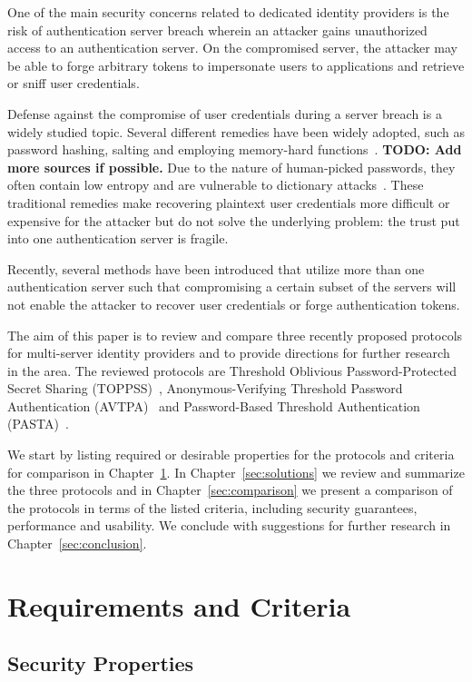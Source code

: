 \documentclass[article]{aaltoseries}
\newcommand{\todo}[1]{}
\renewcommand{\todo}[1]{{\color{red} \textbf{TODO: {#1}}}}
\begin{document}
One of the main security concerns related to dedicated identity providers is the risk of authentication server breach wherein an attacker gains unauthorized access to an authentication server. On the compromised server, the attacker may be able to forge arbitrary tokens to impersonate users to applications and retrieve or sniff user credentials. 

Defense against the compromise of user credentials during a server breach is a widely studied topic. Several different remedies have been widely adopted, such as password hashing, salting and employing memory-hard functions~\cite{argon2}. \todo{Add more sources if possible.} Due to the nature of human-picked passwords, they often contain low entropy and are vulnerable to dictionary attacks~\cite{wangdictattack}. These traditional remedies make recovering plaintext user credentials more difficult or expensive for the attacker but do not solve the underlying problem: the trust put into one authentication server is fragile.

Recently, several methods have been introduced that utilize more than one authentication server such that compromising a certain subset of the servers will not enable the attacker to recover user credentials or forge authentication tokens.

The aim of this paper is to review and compare three recently proposed protocols for multi-server identity providers and to provide directions for further research in the area. The reviewed protocols are Threshold Oblivious Password-Protected Secret Sharing (TOPPSS)~\cite{toppss}, Anonymous-Verifying Threshold Password Authentication (AVTPA)~\cite{avtpa} and Password-Based Threshold Authentication (PASTA)~\cite{pasta}. 

We start by listing required or desirable properties for the protocols and criteria for comparison in Chapter~\ref{sec:criteria}. In Chapter~\ref{sec:solutions} we review and summarize the three protocols and in Chapter~\ref{sec:comparison} we present a comparison of the protocols in terms of the listed criteria, including security guarantees, performance and usability. We conclude with suggestions for further research in Chapter~\ref{sec:conclusion}.


\section{Requirements and Criteria}
\label{sec:criteria}

\subsection{Security Properties}
\end{document}

